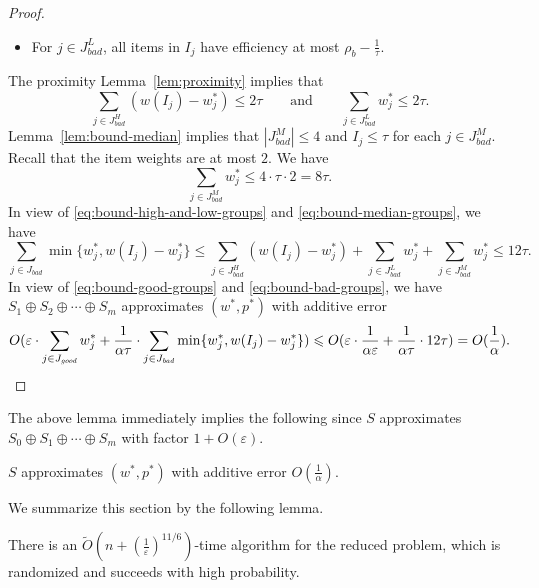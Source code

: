 \documentclass[a4paper,UKenglish,cleveref, autoref, thm-restate, pdfa]{lipics-v2021}
\newcommand{\eps}{\varepsilon}
\renewcommand{\leq}{\leqslant}
\begin{document}
\begin{proof}
\begin{itemize}
        \item For $j \in J^L_{\mathit{bad}}$, all items in $I_j$ have efficiency at most $\rho_b - \frac{1}{\tau}$.
    \end{itemize}
    The proximity Lemma~\ref{lem:proximity} implies that 
    \begin{equation}\label{eq:bound-high-and-low-groups}
        \sum_{j \in J^H_{\mathit{bad}}} (w(I_j) - w^*_j) \leq 2\tau \qquad\text{and}\qquad \sum_{j \in J^L_{\mathit{bad}}} w^*_j \leq 2\tau.
    \end{equation}
    Lemma~\ref{lem:bound-median} implies that $|J^M_{\mathit{bad}}| \leq 4$ and $I_j \leq \tau$ for each $j \in J^M_{\mathit{bad}}$. Recall that the item weights are at most $2$. We have
    \begin{equation}\label{eq:bound-median-groups}
        \sum_{j \in J^M_{\mathit{bad}}} w^*_j \leq 4 \cdot \tau \cdot 2 = 8\tau.
    \end{equation}
    In view of \eqref{eq:bound-high-and-low-groups} and \eqref{eq:bound-median-groups}, we have
    \begin{equation}\label{eq:bound-bad-groups}
        \sum_{j \in J_{\mathit{bad}}} \min\{w^*_j, w(I_j) - w^*_j\} \leq \sum_{j \in J^H_{\mathit{bad}}} (w(I_j) - w^*_j) + \sum_{j \in J^L_{\mathit{bad}}} w^*_j + \sum_{j \in J^M_{\mathit{bad}}} w^*_j \leq  12\tau.
    \end{equation}
    In view of \eqref{eq:bound-good-groups} and \eqref{eq:bound-bad-groups},  we have $S_1 \oplus S_2 \oplus \cdots \oplus S_m$ approximates $(w^*, p^*)$ with additive error
    \[
        O(\eps\cdot \sum_{j \in J_{\mathit{good}}} w^*_j + \frac{1}{\alpha\tau}\cdot\sum_{j \in J_{\mathit{bad}}} \min\{w^*_j, w(I_j) - w^*_j\}) \leq O(\eps \cdot \frac{1}{\alpha\eps} + \frac{1}{\alpha\tau} \cdot 12\tau) = O(\frac{1}{\alpha}). \qedhere
    \]
\end{proof}

The above lemma immediately implies the following since $S$ approximates $S_0 \oplus S_1 \oplus \cdots \oplus S_m$ with factor $1 + O(\eps)$.
\begin{corollary}
    $S$ approximates $(w^*, p^*)$ with additive error $O(\frac{1}{\alpha})$.
\end{corollary}

We summarize this section by the following lemma.
\begin{lemma}
   There is an $\tilde{O}({n+(\frac{1}{\eps})^{11/6}})$-time algorithm for the reduced problem, which is randomized and succeeds with high probability.
\end{lemma}
\end{document}
